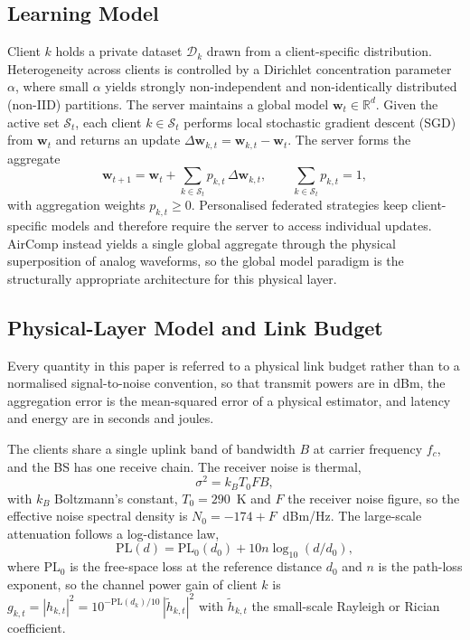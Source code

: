 \documentclass[lettersize,journal]{IEEEtran}
\newcommand{\R}{\mathbb{R}}
\newcommand{\bw}{\bm{w}}
\newcommand{\calS}{\mathcal{S}}
\newcommand{\calD}{\mathcal{D}}
\begin{document}
\subsection{Learning Model}
Client $k$ holds a private dataset $\calD_k$ drawn from a client-specific distribution. Heterogeneity across clients is controlled by a Dirichlet concentration parameter $\alpha$, where small $\alpha$ yields strongly non-independent and non-identically distributed (non-IID) partitions. The server maintains a global model $\bw_t\in\R^d$. Given the active set $\calS_t$, each client $k\in\calS_t$ performs local stochastic gradient descent (SGD) from $\bw_t$ and returns an update $\Delta\bw_{k,t}=\bw_{k,t}-\bw_t$. The server forms the aggregate
\begin{equation}
\bw_{t+1}=\bw_t+\sum_{k\in\calS_t} p_{k,t}\,\Delta\bw_{k,t},
\qquad \sum_{k\in\calS_t}p_{k,t}=1,
\label{eq:agg}
\end{equation}
with aggregation weights $p_{k,t}\ge 0$.
Personalised federated strategies keep client-specific models and therefore require the server to access individual updates. AirComp instead yields a single global aggregate through the physical superposition of analog waveforms, so the global model paradigm is the structurally appropriate architecture for this physical layer.

\subsection{Physical-Layer Model and Link Budget}\label{sec:phy}
Every quantity in this paper is referred to a physical link budget rather than to a normalised signal-to-noise convention, so that transmit powers are in dBm, the aggregation error is the mean-squared error of a physical estimator, and latency and energy are in seconds and joules.

The clients share a single uplink band of bandwidth $B$ at carrier frequency $f_{c}$, and the BS has one receive chain. The receiver noise is thermal,
\begin{equation}
\sigma^{2}=k_{B}T_{0}FB,
\label{eq:thermal}
\end{equation}
with $k_{B}$ Boltzmann's constant, $T_{0}=290$~K and $F$ the receiver noise figure, so the effective noise spectral density is $N_{0}=-174+F$~dBm/Hz. The large-scale attenuation follows a log-distance law,
\begin{equation}
\mathrm{PL}(d)=\mathrm{PL}_{0}(d_{0})+10n\log_{10}(d/d_{0}),
\label{eq:pathloss}
\end{equation}
where $\mathrm{PL}_{0}$ is the free-space loss at the reference distance $d_{0}$ and $n$ is the path-loss exponent, so the channel power gain of client $k$ is $g_{k,t}=|h_{k,t}|^{2}=10^{-\mathrm{PL}(d_{k})/10}\,|\tilde{h}_{k,t}|^{2}$ with $\tilde{h}_{k,t}$ the small-scale Rayleigh or Rician coefficient.
\end{document}
